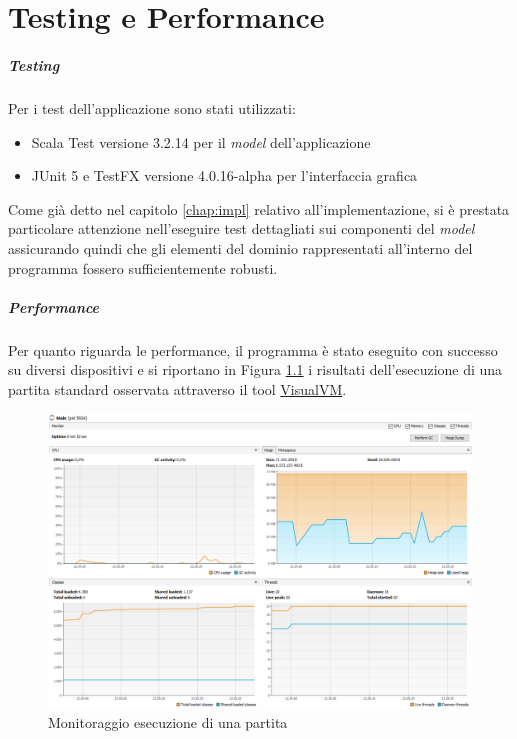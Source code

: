 \chapter{Testing e Performance}
\paragraph{Testing}
    Per i test dell'applicazione sono stati utilizzati:
    \begin{itemize}
        \item Scala Test versione 3.2.14 per il \textit{model} dell'applicazione
        \item JUnit 5 e TestFX versione 4.0.16-alpha per l'interfaccia grafica
    \end{itemize}
    
    Come già detto nel capitolo \ref{chap:impl} relativo all'implementazione, si è prestata particolare attenzione nell'eseguire test dettagliati sui componenti del \textit{model} assicurando quindi che gli elementi del dominio rappresentati all'interno del programma fossero sufficientemente robusti.

\paragraph{Performance}
    Per quanto riguarda le performance, il programma è stato eseguito con successo su diversi dispositivi e si riportano in Figura \ref{fig:visualvm} i risultati dell'esecuzione di una partita standard osservata attraverso il tool \href{https://visualvm.github.io/}{VisualVM}.
    \begin{figure}[H]
        \centering
        \includegraphics[width=\textwidth]{Images/VisualVM.png}
        \caption{Monitoraggio esecuzione di una partita}
        \label{fig:visualvm}
    \end{figure}